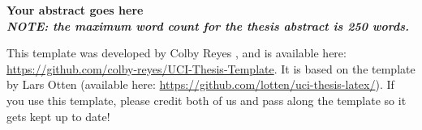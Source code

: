 

\thesisabstract
{
\textbf{Your abstract goes here} \\
\textbf{\textit{NOTE: the maximum word count for the thesis abstract is 250 words.}}

This template was developed by Colby Reyes \cite{uci-thesis-latex_colby-reyes}, and is available here: \url{https://github.com/colby-reyes/UCI-Thesis-Template}. It is based on the template by Lars Otten \cite{uci-thesis-latex_original} (available here: \url{https://github.com/lotten/uci-thesis-latex/}). If you use this template, please credit both of us and pass along the template so it gets kept up to date!

}


